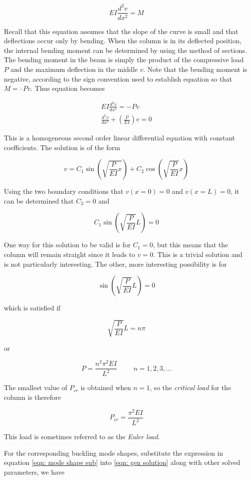 \documentclass[a4paper,openany,12pt]{book}
\begin{document}
{{$$EI\frac{d^2v}{dx^2} = M$$

Recall that this equation assumes that the slope of the curve is small
and that deflections occur only by bending. When the column is in its
deflected position, the internal bending moment can be determined by
using the method of sections. The bending moment in the beam is simply
the product of the compressive load \(P\) and the maximum deflection in
the middle \(v\). Note that the bending moment is negative, according to
the sign convention used to establish equation so that \(M = –Pv\). Thus
equation becomes


$$\begin{gathered}
    EI\frac{d^2v}{dx^2} =  - Pv \\
    \frac{d^2v}{dx^2} + \left( \frac{P}{EI} \right)v = 0 
  \end{gathered}$$

This is a homogeneous second order linear differential equation with
constant coefficients. The solution is of the form

$$ v = C_1\sin \left( \sqrt {\frac{P}{EI} x} \right) + C_2\cos \left( \sqrt {\frac{P}{EI}} x \right)$$

Using the two boundary conditions that \(v(x = 0) = 0\) and
\(v(x = L) = 0\), it can be determined that \(C_2 = 0\) and

$$C_1\sin \left( \sqrt {\frac{P}{EI}} L \right) = 0$$

One way for this solution to be valid is for \(C_1 = 0\), but this means
that the column will remain straight since it leads to \(v = 0\). This is
a trivial solution and is not particularly interesting. The other, more
interesting possibility is for

$$\sin \left( \sqrt {\frac{P}{EI}} L \right) = 0$$

which is satisfied if

$$ \sqrt {\frac{P}{EI}} L = n\pi$$

or

$$P = \frac{n^2\pi^2EI}{L^2} \hspace{1cm}n = 1,2,3,...$$

The smallest value of \(P_{cr}\) is obtained when \(n = 1\), so the
\emph{critical load} for the column is therefore

$$P_{cr} = \frac{\pi ^2EI}{L^2}$$

This load is sometimes referred to as the \emph{Euler load}.

For the corresponding buckling mode shapes, substitute the expression in
equation \ref{eqn: mode shape sub} into \ref{eqn: gen solution} along with other solved
parameters, we have

}}
\end{document}

